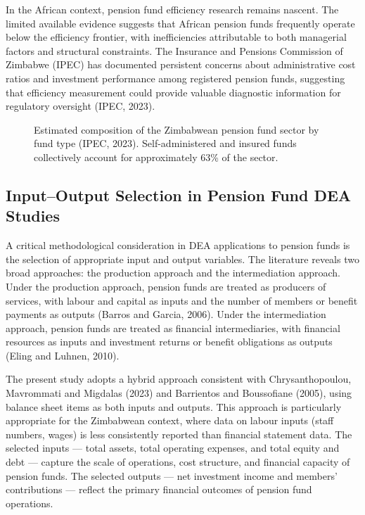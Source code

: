 \documentclass[12pt,a4paper]{article}
\begin{document}
In the African context, pension fund efficiency research remains nascent. The limited available evidence suggests that African pension funds frequently operate below the efficiency frontier, with inefficiencies attributable to both managerial factors and structural constraints. The Insurance and Pensions Commission of Zimbabwe (IPEC) has documented persistent concerns about administrative cost ratios and investment performance among registered pension funds, suggesting that efficiency measurement could provide valuable diagnostic information for regulatory oversight (IPEC, 2023).

\begin{figure}[H]
\centering
{}
\caption{Estimated composition of the Zimbabwean pension fund sector by fund type (IPEC, 2023). Self-administered and insured funds collectively account for approximately 63\% of the sector.}
\label{fig:zim_composition}
\end{figure}

\subsection{Input--Output Selection in Pension Fund DEA Studies}

A critical methodological consideration in DEA applications to pension funds is the selection of appropriate input and output variables. The literature reveals two broad approaches: the production approach and the intermediation approach. Under the production approach, pension funds are treated as producers of services, with labour and capital as inputs and the number of members or benefit payments as outputs (Barros and Garcia, 2006). Under the intermediation approach, pension funds are treated as financial intermediaries, with financial resources as inputs and investment returns or benefit obligations as outputs (Eling and Luhnen, 2010).

The present study adopts a hybrid approach consistent with Chrysanthopoulou, Mavrommati and Migdalas (2023) and Barrientos and Boussofiane (2005), using balance sheet items as both inputs and outputs. This approach is particularly appropriate for the Zimbabwean context, where data on labour inputs (staff numbers, wages) is less consistently reported than financial statement data. The selected inputs --- total assets, total operating expenses, and total equity and debt --- capture the scale of operations, cost structure, and financial capacity of pension funds. The selected outputs --- net investment income and members' contributions --- reflect the primary financial outcomes of pension fund operations.
\end{document}
